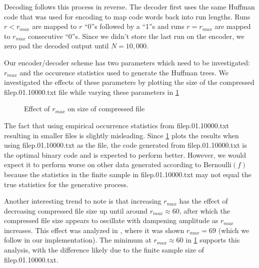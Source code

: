 \documentclass[11pt]{article}
\begin{document}
  Decoding follows this process in reverse. The decoder first uses the same Huffman code
  that was used for encoding to map code words back into run lengths. Runs $r < r_{max}$
  are mapped to $r$ ``0''s followed by a ``1''s and runs $r = r_{max}$ are mapped to
  $r_{max}$ consecutive ``0''s. Since we didn't store the last run on the encoder,
  we zero pad the decoded output until $N=10,000$.

  Our encoder/decoder scheme has two parameters which need to be investigated:
  $r_{max}$ and the occurence statistics used to generate the Huffman trees.
  We investigated the effects of these parameters by plotting the size of the
  compressed {filep.01.10000.txt} file while varying these parameters in
  \ref{fig:size-vs-runLength}

  \begin{figure}[ht!]
    \begin{center}
    \end{center}
    \caption{Effect of $r_{max}$ on size of compressed file}
    \label{fig:size-vs-runLength}
  \end{figure}

  The fact that using empirical occurrence statistics from
  {filep.01.10000.txt} resulting in smaller files is slightly misleading.
  Since \ref{fig:size-vs-runLength} plots the results when using
  {filep.01.10000.txt} as the file, the code generated from
  {filep.01.10000.txt} is the optimal binary code and is expected to
  perform better. However, we would expect it to perform worse on other data
  generated according to $\text{Bernoulli}(f)$ because the statistics in the
  finite sample in {filep.01.10000.txt} may not equal the true statistics
  for the generative process. %

  Another interesting trend to note is that increasing $r_{max}$ has the effect
  of decreasing compressed file size up until around $r_{max} \approx 60$,
  after which the compressed file size appears to oscillate with dampening
  amplitude as $r_{max}$ increases. This effect was analyzed in \cite{LoverH},
  where it was shown $r_{max}=69$ (which we follow in our implementation).
  The minimum at $r_{max} \approx 60$ in \ref{fig:size-vs-runLength} supports
  this analysis, with the difference likely due to the finite sample size
  of {filep.01.10000.txt}.
\end{document}
